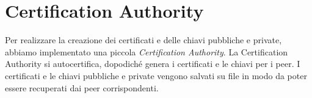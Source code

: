\chapter{Certification Authority}
	Per realizzare la creazione dei certificati e delle chiavi pubbliche
	e private, abbiamo implementato una piccola \emph{Certification Authority}.
	La Certification Authority si autocertifica, dopodiché genera i
	certificati e le chiavi per i peer. I certificati e le chiavi
	pubbliche e private vengono salvati su file in modo da poter essere
	recuperati dai peer corrispondenti.
